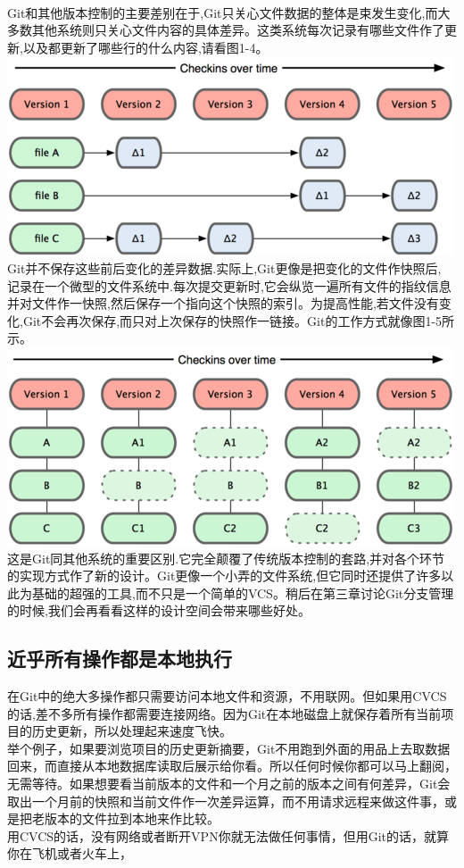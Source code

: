 \documentclass{book}
\begin{document}
	\paragraph{}
	Git和其他版本控制的主要差别在于,Git只关心文件数据的整体是束发生变化,而大多数其他系统则只关心文件内容的具体差异。这类系统每次记录有哪些文件作了更新,以及都更新了哪些行的什么内容,请看图1-4。\\
	\includegraphics{1-4.png}\\
	Git并不保存这些前后变化的差异数据.实际上,Git更像是把变化的文件作快照后, 记录在一个微型的文件系统中.每次提交更新时,它会纵览一遍所有文件的指纹信息并对文件作一快照,然后保存一个指向这个快照的索引。为提高性能,若文件没有变化,Git不会再次保存,而只对上次保存的快照作一链接。Git的工作方式就像图1-5所示。\\
	\includegraphics{1-5.png}\\
	这是Git同其他系统的重要区别.它完全颠覆了传统版本控制的套路,并对各个环节的实现方式作了新的设计。Git更像一个小弄的文件系统,但它同时还提供了许多以此为基础的超强的工具,而不只是一个简单的VCS。稍后在第三章讨论Git分支管理的时候,我们会再看看这样的设计空间会带来哪些好处。\\

	\subsection{近乎所有操作都是本地执行}
	在Git中的绝大多操作都只需要访问本地文件和资源，不用联网。但如果用CVCS的话,差不多所有操作都需要连接网络。因为Git在本地磁盘上就保存着所有当前项目的历史更新，所以处理起来速度飞快。\\
	举个例子，如果要浏览项目的历史更新摘要，Git不用跑到外面的用品上去取数据回来，而直接从本地数据库读取后展示给你看。所以任何时候你都可以马上翻阅，无需等待。如果想要看当前版本的文件和一个月之前的版本之间有何差异，Git会取出一个月前的快照和当前文件作一次差异运算，而不用请求远程来做这件事，或是把老版本的文件拉到本地来作比较。\\
	用CVCS的话，没有网络或者断开VPN你就无法做任何事情，但用Git的话，就算你在飞机或者火车上，
\end{document}
